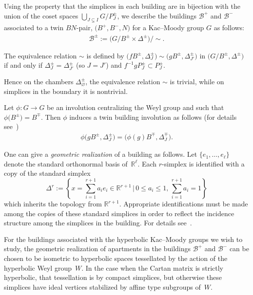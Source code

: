 \documentclass[11pt]{article}
\numberwithin{equation}{section}
\numberwithin{equation}{section}
\def\R{\mathbb{R}}
\def\cB{\mathcal B}
\begin{document}
Using the property that the simplices in each building are in bijection with the union of the coset spaces
$\bigcup_{J\subsetneq I} G/P_{J}^\pm$, we describe the buildings $\cB^+$ and $\cB^-$ associated to a twin $BN$-pair, $\big(B^+, B^-,N\big)$ for a Kac--Moody group $G$ as follows:
\begin{gather}\label{equation:buildingforKacMoodygroup}
\cB^{\pm}:=\big(G/B^{\pm}\times \Delta^\pm\big)/{\sim}.
\end{gather}

The equivalence relation $\sim$ is defined by $\big(fB^{\pm}, \Delta_J^\pm\big) \sim \big(gB^{\pm}, \Delta_{J'}^\pm\big)$ in $\big(G/B^{\pm}, \Delta^\pm\big)$ if and only if $\Delta_J^\pm = \Delta_{J'}^\pm$ (so $J = J'$) and $f^{-1}gP_J^{\pm}\subset P_J^\pm$.

Hence on the chambers $\Delta_{\varnothing}^\pm$, the equivalence relation $\sim$ is trivial, while on simplices in the boundary it is nontrivial.

Let $\phi\colon G\rightarrow G$ be an involution centralizing the Weyl group and such that $\phi\big(B^\pm\big)=B^\mp$. Then $\phi$ induces a twin building involution as follows (for details see~\cite{deMedtsGramlichHorn09, Horn09})
\begin{gather}\label{equation:twin_building_involution}
\phi\big(gB^\pm, \Delta_J^\pm\big)=\big(\phi(g)B^\mp, \Delta_J^\mp\big).
\end{gather}

One can give a {\em geometric realization} of a building as follows. Let $\{e_1,\dots,e_\ell\}$ denote the standard orthonormal basis of~$\R^\ell$. Each $r$-simplex is identified with a copy of the standard simplex
\[\Delta^r := \left\{x = \sum_{i=1}^{r+1} a_i e_i \in \R^{r+1}\, \big|\, 0\leq a_i\leq 1, \, \sum_{i=1}^{r+1} a_i=1 \right\}\]
which inherits the topology from $\R^{r+1}$. Appropriate identifications must be made among the copies of these standard simplices in order to reflect the incidence structure among the simplices in the building. For details see~\cite{AbramenkoBrown08}.

For the buildings associated with the hyperbolic Kac--Moody groups we wish to study, the geometric realization of apartments in the buildings $\cB^+$ and $\cB^-$ can be chosen to be isometric to hyperbolic spaces tessellated by the action of the hyperbolic Weyl group~$W$. In the case when the Cartan matrix is strictly hyperbolic, that tessellation is by compact simplices, but otherwise these simplices have ideal vertices stabilized by affine type subgroups of~$W$.
\end{document}
